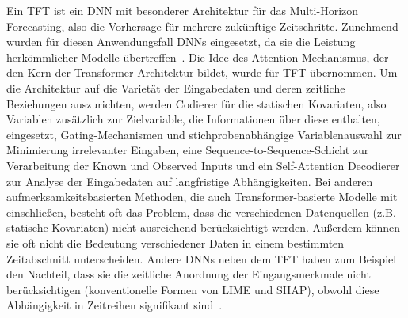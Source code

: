 Ein \ac{TFT} ist ein \ac{DNN} mit besonderer Architektur für das Multi-Horizon Forecasting, also die Vorhersage für mehrere zukünftige Zeitschritte.
Zunehmend wurden für diesen Anwendungsfall \acp{DNN} eingesetzt, da sie die Leistung herkömmlicher Modelle übertreffen~\cite{Lim.19.12.2019}.
Die Idee des Attention-Mechanismus, der den Kern der Transformer-Architektur bildet, wurde für \ac{TFT} übernommen.
Um die Architektur auf die Varietät der Eingabedaten und deren zeitliche Beziehungen auszurichten, werden Codierer für die statischen Kovariaten, also Variablen zusätzlich zur Zielvariable, die Informationen über diese enthalten, eingesetzt, Gating-Mechanismen und stichprobenabhängige Variablenauswahl zur Minimierung irrelevanter Eingaben, eine Sequence-to-Sequence-Schicht zur Verarbeitung der Known und Observed Inputs und ein Self-Attention Decodierer zur Analyse der Eingabedaten auf langfristige Abhängigkeiten.
Bei anderen aufmerksamkeitsbasierten Methoden, die auch Transformer-basierte Modelle mit einschließen, besteht oft das Problem, dass die verschiedenen Datenquellen (z.B. statische Kovariaten) nicht ausreichend berücksichtigt werden.
Außerdem können sie oft nicht die Bedeutung verschiedener Daten in einem bestimmten Zeitabschnitt unterscheiden.
Andere \acp{DNN} neben dem \ac{TFT} haben zum Beispiel den Nachteil, dass sie die zeitliche Anordnung der Eingangsmerkmale nicht berücksichtigen (konventionelle Formen von LIME und SHAP), obwohl diese Abhängigkeit in Zeitreihen signifikant sind~\cite{Lim.19.12.2019}.

